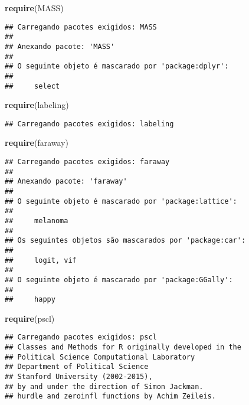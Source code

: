 \documentclass[
]{article}
\newenvironment{Shaded}{\begin{snugshade}}{\end{snugshade}}
\newcommand{\FunctionTok}[1]{\textcolor[rgb]{0.13,0.29,0.53}{\textbf{#1}}}
\newcommand{\NormalTok}[1]{#1}
\begin{document}
\begin{Shaded}
\begin{Highlighting}[]
\FunctionTok{require}\NormalTok{(MASS)}
\end{Highlighting}
\end{Shaded}

\begin{verbatim}
## Carregando pacotes exigidos: MASS
## 
## Anexando pacote: 'MASS'
## 
## O seguinte objeto é mascarado por 'package:dplyr':
## 
##     select
\end{verbatim}

\begin{Shaded}
\begin{Highlighting}[]
\FunctionTok{require}\NormalTok{(labeling)}
\end{Highlighting}
\end{Shaded}

\begin{verbatim}
## Carregando pacotes exigidos: labeling
\end{verbatim}

\begin{Shaded}
\begin{Highlighting}[]
\FunctionTok{require}\NormalTok{(faraway)}
\end{Highlighting}
\end{Shaded}

\begin{verbatim}
## Carregando pacotes exigidos: faraway
## 
## Anexando pacote: 'faraway'
## 
## O seguinte objeto é mascarado por 'package:lattice':
## 
##     melanoma
## 
## Os seguintes objetos são mascarados por 'package:car':
## 
##     logit, vif
## 
## O seguinte objeto é mascarado por 'package:GGally':
## 
##     happy
\end{verbatim}

\begin{Shaded}
\begin{Highlighting}[]
\FunctionTok{require}\NormalTok{(pscl)}
\end{Highlighting}
\end{Shaded}

\begin{verbatim}
## Carregando pacotes exigidos: pscl
## Classes and Methods for R originally developed in the
## Political Science Computational Laboratory
## Department of Political Science
## Stanford University (2002-2015),
## by and under the direction of Simon Jackman.
## hurdle and zeroinfl functions by Achim Zeileis.
\end{verbatim}
\end{document}
